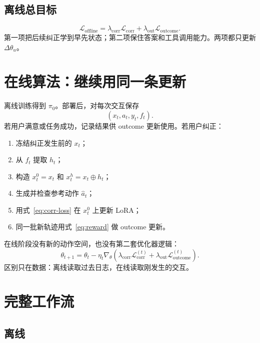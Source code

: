 \documentclass[11pt,UTF8,fontset=fandol]{ctexart}
\newcommand{\lora}{\Delta\theta_u}
\begin{document}
\subsection{离线总目标}

\begin{equation}
  \mathcal L_{\mathrm{offline}}
  =
  \lambda_{\mathrm{corr}}\mathcal L_{\mathrm{corr}}
  +\lambda_{\mathrm{out}}\mathcal L_{\mathrm{outcome}}.
  \label{eq:offline}
\end{equation}
第一项把后续纠正学到早先状态；第二项保住答案和工具调用能力。两项都只更新
\(\lora\)。

\section{在线算法：继续用同一条更新}

离线训练得到 \(\pi_0\)。部署后，对每次交互保存
\[
  (x_t,a_t,y_t,f_t).
\]
若用户满意或任务成功，记录结果供 outcome 更新使用。若用户纠正：
\begin{enumerate}
  \item 冻结纠正发生前的 \(x_t\)；
  \item 从 \(f_t\) 提取 \(h_t\)；
  \item 构造 \(x_t^0=x_t\) 和 \(x_t^h=x_t\oplus h_t\)；
  \item 生成并检查参考动作 \(\widehat a_t\)；
  \item 用式~\eqref{eq:corr-loss} 在 \(x_t^0\) 上更新 LoRA；
  \item 同一批新轨迹用式~\eqref{eq:reward} 做 outcome 更新。
\end{enumerate}

在线阶段没有新的动作空间，也没有第二套优化器逻辑：
\begin{equation}
  \theta_{t+1}
  =
  \theta_t-\eta_t\nabla_\theta
  \left(
    \lambda_{\mathrm{corr}}\mathcal L_{\mathrm{corr}}^{(t)}
    +\lambda_{\mathrm{out}}\mathcal L_{\mathrm{outcome}}^{(t)}
  \right).
\end{equation}
区别只在数据：离线读取过去日志，在线读取刚发生的交互。

\section{完整工作流}

\subsection{离线}
\end{document}
